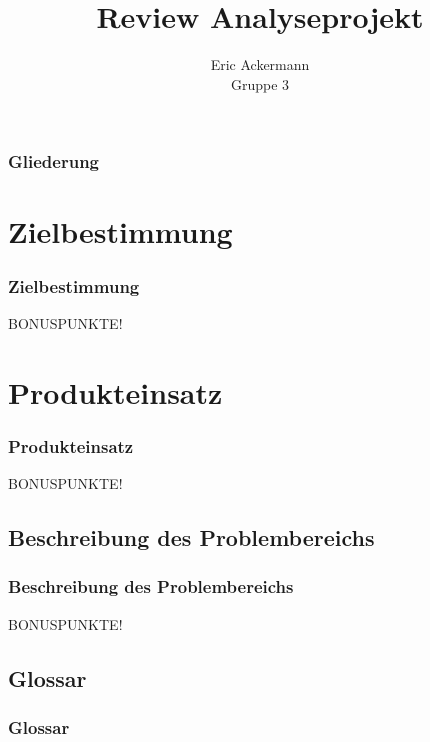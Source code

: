 \documentclass{beamer}
\begin{document}
			
	
	\title[Review Analyseprojekt]{Review Analyseprojekt}
	\author[Eric Ackermann]{Eric Ackermann\\ Gruppe 3}
	
	 \begin{frame}[title=Hauptgebaeude_Nacht.jpg]
	 \maketitle
 	\end{frame}
	 
	\begin{frame}
		\frametitle{Gliederung}
		\tableofcontents
	\end{frame}

\section{Zielbestimmung}		
\begin{frame}
\frametitle{Zielbestimmung}
BONUSPUNKTE!
\end{frame}

\section{Produkteinsatz}		
\begin{frame}
\frametitle{Produkteinsatz}
BONUSPUNKTE!
\end{frame}

\subsection{Beschreibung des Problembereichs}		
\begin{frame}
\frametitle{Beschreibung des Problembereichs}
BONUSPUNKTE!
\end{frame}

\subsection{Glossar}		
\begin{frame}
\frametitle{Glossar}
\begin{acronym}[qualit.]  
\end{acronym}
\end{frame}
\end{document}
